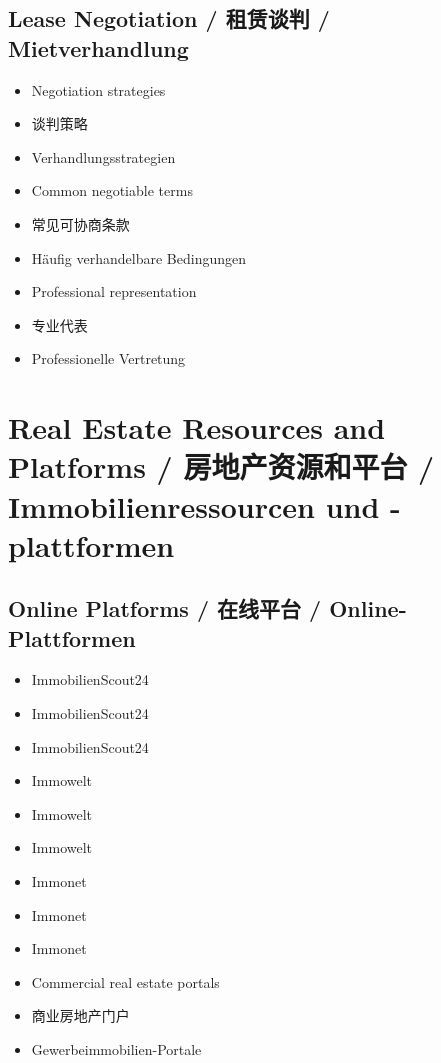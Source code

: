 \subsection{Lease Negotiation / 租赁谈判 / Mietverhandlung}
\begin{itemize}
    \item Negotiation strategies
    \item 谈判策略
    \item Verhandlungsstrategien
    \item Common negotiable terms
    \item 常见可协商条款
    \item Häufig verhandelbare Bedingungen
    \item Professional representation
    \item 专业代表
    \item Professionelle Vertretung
\end{itemize}

\section{Real Estate Resources and Platforms / 房地产资源和平台 / Immobilienressourcen und -plattformen}

\subsection{Online Platforms / 在线平台 / Online-Plattformen}
\begin{itemize}
    \item ImmobilienScout24
    \item ImmobilienScout24
    \item ImmobilienScout24
    \item Immowelt
    \item Immowelt
    \item Immowelt
    \item Immonet
    \item Immonet
    \item Immonet
    \item Commercial real estate portals
    \item 商业房地产门户
    \item Gewerbeimmobilien-Portale
\end{itemize}

